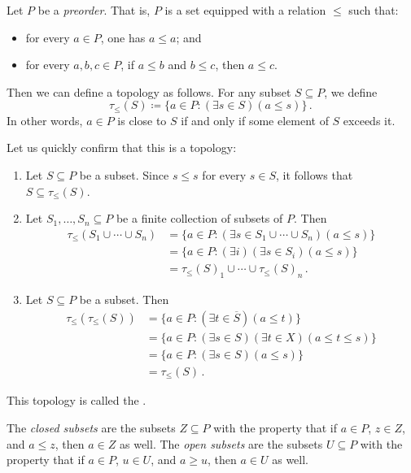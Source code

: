 \begin{exm}%
\label{exm:Alexandroff}
	Let $P$ be a \emph{preorder}.
	That is, $P$ is a set equipped with a relation $\leq $ such that:
	\begin{itemize}
		\item for every $a \in P$, one has $a \leq a$; and
		\item for every $a,b,c \in P$, if $a \leq b$ and $b \leq c$, then $a \leq c$.
	\end{itemize}
	Then we can define a topology as follows.
	For any subset $S \subseteq P$, we define
	\[
		\tau_{\leq}(S) \coloneq \{a \in P : (\exists s \in S)(a \leq s) \} \period
	\]
	In other words, $ a \in P $ is close to $S$ if and only if some element of $S$ exceeds it.

	Let us quickly confirm that this is a topology:
	\begin{enumerate}
		\item Let $S \subseteq P$ be a subset.
			Since $ s \leq s $ for every $ s \in S$, it follows that $S \subseteq \tau_{\leq}(S)$.
		\item Let $S_1, \dots, S_n \subseteq P$ be a finite collection of subsets of $P$.
			Then
			\begin{align*}
				\tau_{\leq}(S_1 \cup \cdots \cup S_n) & = \{a\in P : (\exists s \in S_1 \cup \cdots \cup S_n)(a \leq s) \} \\
								    & = \{a \in P : (\exists i)(\exists s \in S_i)(a \leq s)\} \\
								    & = \tau_{\leq}(S)_1 \cup \cdots \cup \tau_{\leq}(S)_n \period
			\end{align*}
		\item Let $S \subseteq P$ be a subset.
			Then
			\begin{align*}
				\tau_{\leq}(\tau_{\leq}(S)) &= \{a \in P : (\exists t \in \overline{S})(a \leq t) \} \\
							&= \{a \in P : (\exists s \in S)(\exists t \in X)(a \leq t \leq s) \} \\
							&= \{a \in P : (\exists s \in S)(a \leq s) \} \\
							&= \tau_{\leq}(S) \period 
			\end{align*}
	\end{enumerate}
	This topology is called the .

	The \emph{closed subsets} are the subsets $Z \subseteq P$ with the property that if $ a \in P $, $z \in Z$, and $ a \leq z$, then $a \in Z $ as well.
	The \emph{open subsets} are the subsets $U \subseteq P $ with the property that if $a \in P$, $u \in U$, and $a \geq u$, then $a \in U $ as well.
\end{exm}

